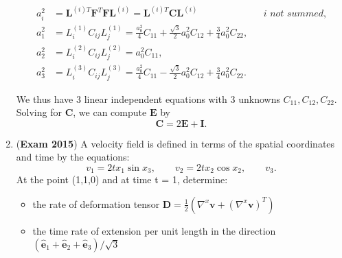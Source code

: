 \documentclass{article}
\newcommand{\ee}{\end{equation}}
\newcommand{\be}{\begin{equation}}
\newcommand{\bi}{\begin{itemize}}
\newcommand{\ei}{\end{itemize}}
\newcommand{\bs}{\boldsymbol}
\newcommand{\tbf}{\textbf}
\newif\ifsolution
\begin{document}
\begin{enumerate}
\begin{align}
a_i^2 &= \bs L^{(i)T} \bs F^T \bs F \bs L^{(i)} = \bs L^{(i)T} \bs C  \bs L^{(i)} && \textit{$i$ not summed,} \\
a_1^2 &= L_i^{(1)} C_{ij}L_j^{(1)} = \frac{a_0^2}{4} C_{11} + \frac{\sqrt{3}}{2} a_0^2 C_{12} + \frac{3}{4} a_0^2
C_{22}, && \\
a_2^2 &= L_i^{(2)} C_{ij} L_j^{(2)} = a_0^2 C_{11}, && \\
a_3^2 &= L_i^{(3)} C_{ij} L_j^{(3)} = \frac{a_0^2}{4}C_{11} - \frac{\sqrt{3}}{2}a_0^2 C_{12} + \frac{3}{4}a_0^2
C_{22}.
\end{align}

We thus have 3 linear independent equations with 3 unknowns $C_{11},C_{12}, C_{22}$. Solving for $\bs C$, we can compute $\bs E$ by
\be
\bs C = 2\bs E + \bs I.
\ee
\fi

\item (\tbf{Exam 2015}) A velocity field is defined in terms of the spatial coordinates and time by the
equations:
\be
v_1 = 2tx_1 \sin x_3, \qquad v_2 = 2tx_2 \cos x_2, \qquad v_3.
\ee
At the point (1,1,0) and at time t = 1, determine:
\bi
\item the rate of deformation tensor $\bs D = \frac{1}{2}(\nabla^x \bs v + (\nabla^x \bs v)^T)$
\item the time rate of extension per unit length in the direction $(\hat{\bs e}_1 + \hat{\bs e}_2 + \hat{\bs e}_3)/\sqrt{3}$
\ei

\ifsolution
\underline{Solution:}
\be
D_{ij} = \frac{1}{2}(v_{i,j} + v_{j,i}).
\ee

\begin{align}
&v_{1,1} = 2t\sin x_3 &&v_{2,1} = 0 &&&v_{3,1} = 0 \\ \nonumber
&v_{1,2} = 0 &&v_{2,2} = 2t\cos x_2 - 2tx_2\sin x_2 &&&v_{3,2} = 0 \\ \nonumber
&v_{1,3} = 2tx_1 \cos x_3 &&v_{2,3} = 0 &&&v_{3,3} = 0,
\end{align}
Hence
\be
\bs D = \begin{pmatrix}
2t\sin x_3 & 0 & tx_1 \cos x_3 \\
0 & 2t\cos x_2 - 2t x_2 \sin x_2 & 0 \\
t x_1 \cos x_3 & 0 & 0
\end{pmatrix},
\ee
\be
\bs D(\bs x = (1,1,0), t = 1) = \begin{pmatrix}
0 & 0 & 1 \\
0 & 2\cos 1 - 2\sin 1 & 0 \\
1 & 0 & 0
\end{pmatrix}.
\ee
Lecture:

For $d\bs x = \bs n dx$ with $\bs n$ the normalized direction vector,
\be
\frac{1}{dx}\frac{d}{dt}(dx) = \bs n \cdot \bs D \bs n = 2 + 2\cos 1 - 2\sin 1.
\ee
\fi

\end{enumerate}
\end{document}
